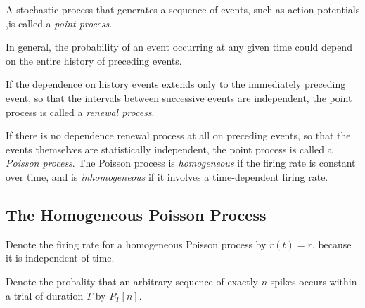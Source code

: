 \begin{defn}%
    A stochastic process that generates a sequence of events, such as action potentials ,is called a \emph{point process}.     
\end{defn}

\begin{rem}
    In general, the probability of an event occurring at any given time could depend on the entire history of preceding events. 
\end{rem}

\begin{defn}%
    If the dependence on history events extends only to the immediately preceding event, so that the intervals between successive events are independent, the point process is called a \emph{renewal process}.
\end{defn}

\begin{defn}
     If there is no dependence renewal process at all on preceding events, so that the events themselves are statistically independent, the point process is called a \emph{Poisson process}. The Poisson process is \emph{homogeneous} if the firing rate is constant over time, and is \emph{inhomogeneous} if it involves a time-dependent firing rate.
\end{defn}

\subsection{The Homogeneous Poisson Process}

\begin{ntn}
  Denote the firing rate for a homogeneous Poisson process by $r(t)=r$, because it is independent of time.
\end{ntn}

\begin{ntn}
  Denote the probality that an arbitrary sequence of exactly $n$ spikes occurs within a trial of duration $T$ by $P_T[n]$.
\end{ntn}

